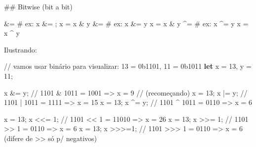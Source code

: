 \documentclass[
  portuguese,
  letterpaper,
  DIV=11,
  numbers=noendperiod]{scrreprt}
\newenvironment{Shaded}{\begin{snugshade}}{\end{snugshade}}
\newcommand{\CommentTok}[1]{\textcolor[rgb]{0.37,0.37,0.37}{#1}}
\newcommand{\DecValTok}[1]{\textcolor[rgb]{0.68,0.00,0.00}{#1}}
\newcommand{\FunctionTok}[1]{\textcolor[rgb]{0.28,0.35,0.67}{#1}}
\newcommand{\KeywordTok}[1]{\textcolor[rgb]{0.00,0.23,0.31}{\textbf{#1}}}
\newcommand{\NormalTok}[1]{\textcolor[rgb]{0.00,0.23,0.31}{#1}}
\newcommand{\OperatorTok}[1]{\textcolor[rgb]{0.37,0.37,0.37}{#1}}
\begin{document}
\hfill\break

\begin{Shaded}
\begin{Highlighting}[]
\NormalTok{\#\# }\FunctionTok{Bitwise}\NormalTok{ (bit a bit)}

\OperatorTok{\&=}\NormalTok{ \# ex}\OperatorTok{:}\NormalTok{ x }\OperatorTok{\&=} \OperatorTok{;}\NormalTok{ x }\OperatorTok{=}\NormalTok{ x }\OperatorTok{\&}\NormalTok{ y}
\OperatorTok{\&=}\NormalTok{ \# ex}\OperatorTok{:}\NormalTok{ x }\OperatorTok{\&=}\NormalTok{ y     x }\OperatorTok{=}\NormalTok{ x }\OperatorTok{\&}\NormalTok{ y}
\OperatorTok{\^{}=}\NormalTok{ \# ex}\OperatorTok{:}\NormalTok{ x }\OperatorTok{\^{}=}\NormalTok{ y     x }\OperatorTok{=}\NormalTok{ x }\OperatorTok{\^{}}\NormalTok{ y}

\NormalTok{    Ilustrando}\OperatorTok{:}

\CommentTok{// vamos usar binário para visualizar: 13 = 0b1101, 11 = 0b1011}
\KeywordTok{let}\NormalTok{ x }\OperatorTok{=} \DecValTok{13}\OperatorTok{,}\NormalTok{ y }\OperatorTok{=} \DecValTok{11}\OperatorTok{;}

\NormalTok{x }\OperatorTok{\&=}\NormalTok{ y}\OperatorTok{;}          \CommentTok{// 1101 \& 1011 = 1001  =\textgreater{} x = 9}
\CommentTok{// (recomeçando)}
\NormalTok{x }\OperatorTok{=} \DecValTok{13}\OperatorTok{;}\NormalTok{ x }\OperatorTok{|=}\NormalTok{ y}\OperatorTok{;}  \CommentTok{// 1101 | 1011 = 1111  =\textgreater{} x = 15}
\NormalTok{x }\OperatorTok{=} \DecValTok{13}\OperatorTok{;}\NormalTok{ x }\OperatorTok{\^{}=}\NormalTok{ y}\OperatorTok{;}  \CommentTok{// 1101 \^{} 1011 = 0110  =\textgreater{} x = 6}

\NormalTok{x }\OperatorTok{=} \DecValTok{13}\OperatorTok{;}\NormalTok{ x }\OperatorTok{\textless{}\textless{}=} \DecValTok{1}\OperatorTok{;} \CommentTok{// 1101 \textless{}\textless{} 1  = 11010 =\textgreater{} x = 26}
\NormalTok{x }\OperatorTok{=} \DecValTok{13}\OperatorTok{;}\NormalTok{ x }\OperatorTok{\textgreater{}\textgreater{}=} \DecValTok{1}\OperatorTok{;} \CommentTok{// 1101 \textgreater{}\textgreater{} 1  = 0110  =\textgreater{} x = 6}
\NormalTok{x }\OperatorTok{=} \DecValTok{13}\OperatorTok{;}\NormalTok{ x }\OperatorTok{\textgreater{}\textgreater{}\textgreater{}=}\DecValTok{1}\OperatorTok{;} \CommentTok{// 1101 \textgreater{}\textgreater{}\textgreater{} 1 = 0110  =\textgreater{} x = 6  (difere de \textgreater{}\textgreater{} só p/ negativos)}
\end{Highlighting}
\end{Shaded}
\end{document}
